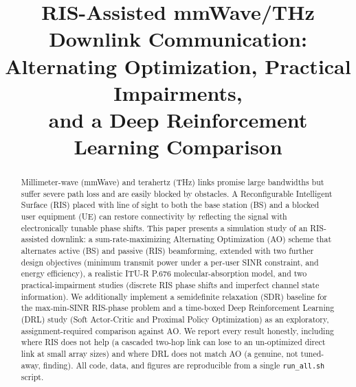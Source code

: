 \documentclass[conference]{IEEEtran}
\newcommand{\IRS}{RIS}
\begin{document}
\title{RIS-Assisted mmWave/THz Downlink Communication:\\
Alternating Optimization, Practical Impairments,\\
and a Deep Reinforcement Learning Comparison}

\author{
}

\maketitle

\begin{abstract}
Millimeter-wave (mmWave) and terahertz (THz) links promise large
bandwidths but suffer severe path loss and are easily blocked by
obstacles. A Reconfigurable Intelligent Surface (\IRS{}) placed with
line of sight to both the base station (BS) and a blocked user equipment
(UE) can restore connectivity by reflecting the signal with
electronically tunable phase shifts. This paper presents a simulation
study of an \IRS{}-assisted downlink: a sum-rate-maximizing Alternating
Optimization (AO) scheme that alternates active (BS) and passive
(\IRS{}) beamforming, extended with two further design objectives
(minimum transmit power under a per-user SINR constraint, and energy
efficiency), a realistic ITU-R P.676 molecular-absorption model, and two
practical-impairment studies (discrete \IRS{} phase shifts and imperfect
channel state information). We additionally implement a semidefinite
relaxation (SDR) baseline for the max-min-SINR \IRS{}-phase problem and
a time-boxed Deep Reinforcement Learning (DRL) study (Soft Actor-Critic
and Proximal Policy Optimization) as an exploratory, assignment-required
comparison against AO. We report every result honestly, including where
\IRS{} does not help (a cascaded two-hop link can lose to an
un-optimized direct link at small array sizes) and where DRL does not
match AO (a genuine, not tuned-away, finding). All code, data, and
figures are reproducible from a single \texttt{run\_all.sh} script.
\end{abstract}
\end{document}
